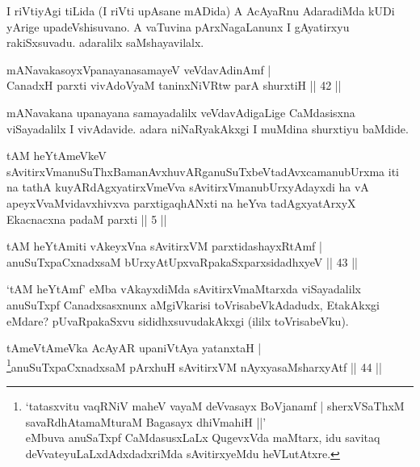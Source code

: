 \begin{artha} 
I riVtiyAgi tiLida (I riVti upAsane mADida) A AcAyaRnu AdaradiMda kUDi 
yArige upadeVshisuvano. A vaTuvina pArxNagaLanunx I gAyatirxyu 
rakiSxsuvadu. adaralilx saMshayavilalx.
\end{artha}


\begin{shl}
mANavakasoyxVpanayanasamayeV veVdavAdinAmf | \\
CanadxH parxti vivAdoV\s yaM taninxNiVRtw parA shurxtiH \hfill ||  42 || 
\end{shl}

\begin{artha} 
mANavakana upanayana samayadalilx veVdavAdigaLige CaMdasisxna 
viSayadalilx I vivAdavide. adara niNaRyakAkxgi I muMdina shurxtiyu 
baMdide.
\end{artha}

\begin{kandikeshl}
tAM heYtAmeVkeV sAvitirxVmanuSuThxBamanAvxhuvARganuSuTxbeVtadAvxca\-\break manubUrxma iti na tathA kuyARdAgxyatirxVmeVva sAvitirxVmanu\-\break bUrxyAdayxdi ha vA apeyxVvaMvidavxhivxva parxtigaqhANxti na heYva tadAgxyatArxyX Ekacnacxna padaM parxti || 5 ||
\end{kandikeshl}


\begin{shl}
tAM heYtAmiti vAkeyxVna sAvitirxVM parxtidashayxRtAmf | \\
anuSuTxpaCxnadxsaM bUrxyAtUpxvaRpakaSxparxsidadhxyeV \hfill ||  43 || 
\end{shl}

\begin{artha} 
`tAM heYtAmf' eMba vAkayxdiMda sAvitirxVmaMtarxda viSayadalilx 
anuSuTxpf Canadxsasxnunx aMgiVkarisi toVrisabeVkAdadudx, EtakAkxgi eMdare? pUvaRpakaSxvu sididhxsuvudakAkxgi (ililx toVrisabeVku).
\end{artha}



\begin{shl}
tAmeVtAmeVka AcAyAR upaniVtAya yatanxtaH | \\
\footnote{`tatasxvitu vaqRNiV maheV vayaM deVvasayx BoVjanamf |
sherxVSaThxM savaRdhAtamaMturaM Bagasayx dhiVmahiH ||' \\ eMbuva anuSaTxpf CaMdasusxLaLx QugevxVda maMtarx, idu savitaq deVvateyuLaLxdAdxdadxriMda sAvitirxyeMdu heVLutAtxre.}anuSuTxpaCxnadxsaM pArxhuH sAvitirxVM nAyxyasaMsharxyAtf \hfill ||  44 || 
\end{shl}

